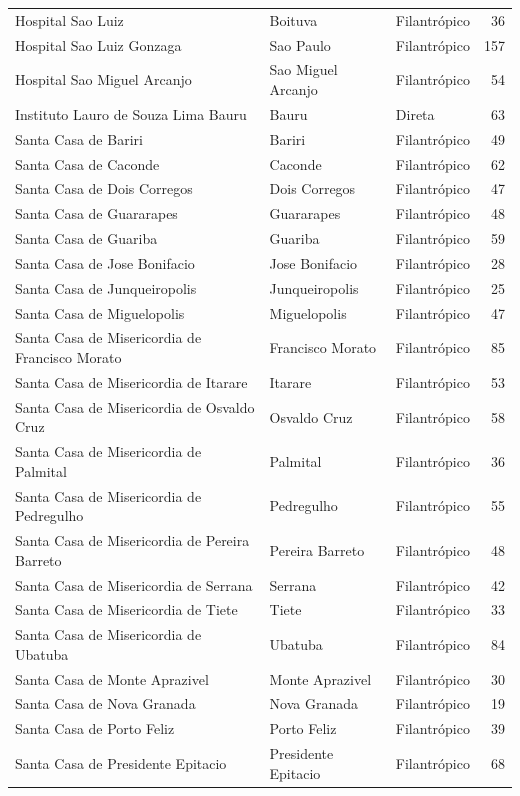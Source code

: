 {\begin{longtable}{p{}p{}lr}
Hospital Sao Luiz & Boituva & Filantrópico & 36 \\
Hospital Sao Luiz Gonzaga & Sao Paulo & Filantrópico & 157 \\
Hospital Sao Miguel Arcanjo & Sao Miguel Arcanjo & Filantrópico & 54 \\
Instituto Lauro de Souza Lima Bauru & Bauru & Direta & 63 \\
Santa Casa de Bariri & Bariri & Filantrópico & 49 \\
Santa Casa de Caconde & Caconde & Filantrópico & 62 \\
Santa Casa de Dois Corregos & Dois Corregos & Filantrópico & 47 \\
Santa Casa de Guararapes & Guararapes & Filantrópico & 48 \\
Santa Casa de Guariba & Guariba & Filantrópico & 59 \\
Santa Casa de Jose Bonifacio & Jose Bonifacio & Filantrópico & 28 \\
Santa Casa de Junqueiropolis & Junqueiropolis & Filantrópico & 25 \\
Santa Casa de Miguelopolis & Miguelopolis & Filantrópico & 47 \\
Santa Casa de Misericordia de Francisco Morato & Francisco Morato & Filantrópico & 85 \\
Santa Casa de Misericordia de Itarare & Itarare & Filantrópico & 53 \\
Santa Casa de Misericordia de Osvaldo Cruz & Osvaldo Cruz & Filantrópico & 58 \\
Santa Casa de Misericordia de Palmital & Palmital & Filantrópico & 36 \\
Santa Casa de Misericordia de Pedregulho & Pedregulho & Filantrópico & 55 \\
Santa Casa de Misericordia de Pereira Barreto & Pereira Barreto & Filantrópico & 48 \\
Santa Casa de Misericordia de Serrana & Serrana & Filantrópico & 42 \\
Santa Casa de Misericordia de Tiete & Tiete & Filantrópico & 33 \\
Santa Casa de Misericordia de Ubatuba & Ubatuba & Filantrópico & 84 \\
Santa Casa de Monte Aprazivel & Monte Aprazivel & Filantrópico & 30 \\
Santa Casa de Nova Granada & Nova Granada & Filantrópico & 19 \\
Santa Casa de Porto Feliz & Porto Feliz & Filantrópico & 39 \\
Santa Casa de Presidente Epitacio & Presidente Epitacio & Filantrópico & 68 \\

\end{longtable}}
